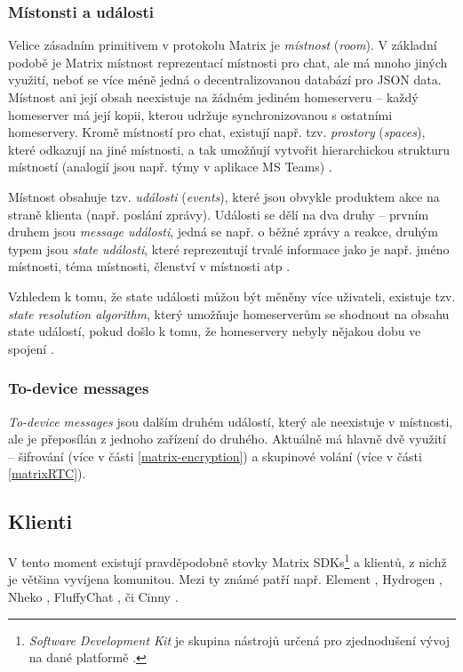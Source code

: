 \subsubsection{Místonsti a události}

Velice zásadním primitivem v protokolu Matrix je \textit{místnost}
(\textit{room}). V základní podobě je Matrix místnost reprezentací místnosti
pro chat, ale má mnoho jiných využití, neboť se více méně jedná o
decentralizovanou databází pro JSON data. Místnost ani její obsah neexistuje na
žádném jediném homeserveru -- každý homeserver má její kopii, kterou udržuje
synchronizovanou s ostatními homeservery. Kromě místností pro chat, existují
např. tzv. \textit{prostory} (\textit{spaces}), které odkazují na jiné
místnosti, a tak umožňují vytvořit hierarchickou strukturu místností (analogií
jsou např. týmy v aplikace MS Teams) \cite{MatrixORG-Spec}.

Místnost obsahuje tzv. \textit{události} (\textit{events}), které jsou obvykle
produktem akce na straně klienta (např. poslání zprávy). Události se dělí na dva
druhy -- prvním druhem jsou \textit{message události}, jedná se např. o běžné
zprávy a reakce, druhým typem jsou \textit{state události}, které reprezentují
trvalé informace jako je např. jméno místnosti, téma místnosti, členství v
místnosti atp \cite{MatrixORG-Spec}.

Vzhledem k tomu, že state události můžou být měněny více uživateli, existuje tzv.
\textit{state resolution algorithm}, který umožňuje homeserverům se shodnout na
obsahu state událostí, pokud došlo k tomu, že homeservery nebyly nějakou dobu ve
spojení \cite{MatrixORG-Spec}.

\subsubsection{To-device messages}

\textit{To-device messages} jsou dalším druhém událostí, který ale neexistuje v
místnosti, ale je přeposílán z jednoho zařízení do druhého. Aktuálně má hlavně
dvě využití -- šifrování (více v části \ref{matrix-encryption}) a skupinové
volání (více v části \ref{matrixRTC}).

\subsection{Klienti}

V tento moment existují pravděpodobně stovky Matrix SDKs\footnote{
	\textit{Software Development Kit} je skupina nástrojů určená pro zjednodušení
	vývoj na dané platformě \cite{RedHat-WhatIsAnSDK}.
} a klientů, z nichž je většina vyvíjena komunitou. Mezi ty známé patří např.
Element \cite{Element-Homepage}, Hydrogen \cite{GitHub-Hydrogen}, Nheko
\cite{GitHub-Nheko}, FluffyChat \cite{FluffyChat-Homepage}, či Cinny
\cite{Cinny-Homepage}.

